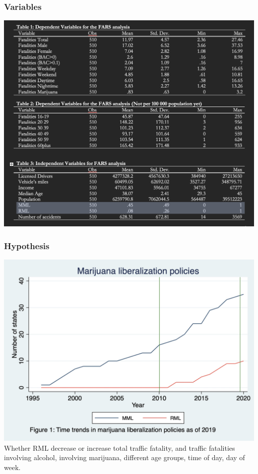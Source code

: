 \documentclass{beamer}
\begin{document}
\begin{frame} %
\frametitle{Variables}

	\includegraphics[scale = 0.33]{table123}

\end{frame}

\begin{frame} %
\frametitle{Hypothesis}

	\includegraphics[scale = 0.08]{fig_1.jpg} \\
	Whether RML decrease or increase total traffic fatality, and traffic fatalities involving alcohol, involving marijuana,  different age groups, time of day, day of week.
	
\end{frame}
\end{document}

